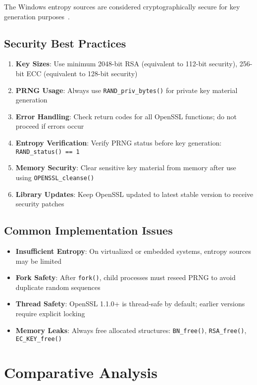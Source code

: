 The Windows entropy sources are considered cryptographically secure for key generation purposes~\cite{gutmann1998software}.

\subsection{Security Best Practices}
\begin{enumerate}
    \item \textbf{Key Sizes}: Use minimum 2048-bit RSA (equivalent to 112-bit security), 256-bit ECC (equivalent to 128-bit security)~\cite{barker2020recommendation}
    \item \textbf{PRNG Usage}: Always use \texttt{RAND\_priv\_bytes()} for private key material generation
    \item \textbf{Error Handling}: Check return codes for all OpenSSL functions; do not proceed if errors occur
    \item \textbf{Entropy Verification}: Verify PRNG status before key generation: \texttt{RAND\_status() == 1}
    \item \textbf{Memory Security}: Clear sensitive key material from memory after use using \texttt{OPENSSL\_cleanse()}
    \item \textbf{Library Updates}: Keep OpenSSL updated to latest stable version to receive security patches
\end{enumerate}

\subsection{Common Implementation Issues}
\begin{itemize}
    \item \textbf{Insufficient Entropy}: On virtualized or embedded systems, entropy sources may be limited
    \item \textbf{Fork Safety}: After \texttt{fork()}, child processes must reseed PRNG to avoid duplicate random sequences
    \item \textbf{Thread Safety}: OpenSSL 1.1.0+ is thread-safe by default; earlier versions require explicit locking
    \item \textbf{Memory Leaks}: Always free allocated structures: \texttt{BN\_free()}, \texttt{RSA\_free()}, \texttt{EC\_KEY\_free()}
\end{itemize}

\section{Comparative Analysis}

